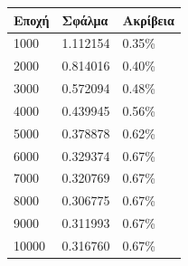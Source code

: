 \begin{center}
\begin{tabular}{|l|l|l|}
\hline
\textbf{Εποχή} & \textbf{Σφάλμα} & \textbf{Ακρίβεια} \\ \hline
1000		   & 1.112154        & 0.35\%            \\ \hline
2000		   & 0.814016        & 0.40\%            \\ \hline
3000		   & 0.572094        & 0.48\%            \\ \hline
4000		   & 0.439945        & 0.56\%            \\ \hline
5000		   & 0.378878        & 0.62\%            \\ \hline
6000		   & 0.329374        & 0.67\%            \\ \hline
7000		   & 0.320769        & 0.67\%            \\ \hline
8000		   & 0.306775        & 0.67\%            \\ \hline
9000		   & 0.311993        & 0.67\%            \\ \hline
10000		   & 0.316760        & 0.67\%            \\ \hline
\end{tabular}
\end{center}
 \label{tab:title}

